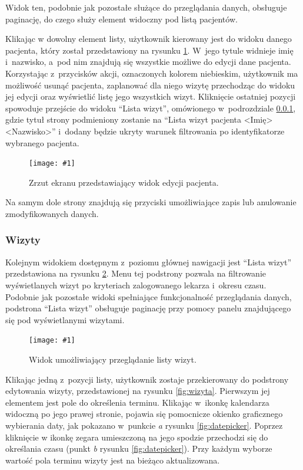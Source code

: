 \documentclass[11pt]{aghdpl}
\newcommand{\fullWidthPicture}[2]{
\begin{figure}[h!]
	\centering
		\texttt{[image: \#1]}
	\caption{#2}
	\label{fig:#1}
\end{figure}
}
\begin{document}
Widok ten, podobnie jak pozostałe służące do przeglądania danych, obsługuje paginację, do czego służy element widoczny pod listą pacjentów.

Klikając w dowolny element listy, użytkownik kierowany jest do widoku danego pacjenta, który został przedstawiony na rysunku \ref{fig:pacjent}. W~jego tytule widnieje imię i~nazwisko, a~pod nim znajdują się wszystkie możliwe do edycji dane pacjenta. Korzystając z~przycisków akcji, oznaczonych kolorem niebieskim, użytkownik ma możliwość usunąć pacjenta, zaplanować dla niego wizytę przechodząc do widoku jej edycji oraz wyświetlić listę jego wszystkich wizyt. Kliknięcie ostatniej pozycji spowoduje przejście do widoku ``Lista wizyt'', omówionego w~podrozdziale \ref{sec:wizyty}, gdzie tytuł strony podmieniony zostanie na ``Lista wizyt pacjenta <Imię> <Nazwisko>'' i~dodany będzie ukryty warunek filtrowania po identyfikatorze wybranego pacjenta.

\fullWidthPicture{pacjent}{Zrzut ekranu przedstawiający widok edycji pacjenta.}

Na samym dole strony znajdują się przyciski umożliwiające zapis lub anulowanie zmodyfikowanych danych.

\subsubsection{Wizyty}
\label{sec:wizyty}

Kolejnym widokiem dostępnym z~poziomu głównej nawigacji jest ``Lista wizyt'' przedstawiona na rysunku \ref{fig:wizyty}. Menu tej podstrony pozwala na filtrowanie wyświetlanych wizyt po kryteriach zalogowanego lekarza i~okresu czasu. Podobnie jak pozostałe widoki spełniające funkcjonalność przeglądania danych, podstrona ``Lista wizyt'' obsługuje paginację przy pomocy panelu znajdującego się pod wyświetlanymi wizytami.

\fullWidthPicture{wizyty}{Widok umożliwiający przeglądanie listy wizyt.}

Klikając jedną z~pozycji listy, użytkownik zostaje przekierowany do podstrony edytowania wizyty,   przedstawionej na rysunku \ref{fig:wizyta}. Pierwszym jej elementem jest pole do określenia terminu. Klikając w~ikonkę kalendarza widoczną po jego prawej stronie, pojawia się pomocnicze okienko graficznego wybierania daty, jak pokazano w~punkcie \emph{a} rysunku \ref{fig:datepicker}. Poprzez kliknięcie w ikonkę zegara umieszczoną na jego spodzie przechodzi się do określania czasu (punkt \emph{b} rysunku \ref{fig:datepicker}). Przy każdym wyborze wartość pola terminu wizyty jest na bieżąco aktualizowana.
\end{document}
